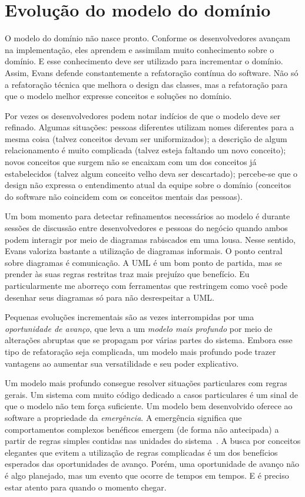 \documentclass[a4paper, 12pt]{article}
\begin{document}
\section{Evolução do modelo do domínio}

O modelo do domínio não nasce pronto. Conforme os desenvolvedores avançam na implementação, eles aprendem e assimilam muito conhecimento sobre o domínio. E esse conhecimento deve ser utilizado para incrementar o domínio. Assim, Evans defende constantemente a refatoração contínua do software. Não só a refatoração técnica que melhora o design das classes, mas a refatoração para que o modelo melhor expresse conceitos e soluções no domínio.

Por vezes os desenvolvedores podem notar indícios de que o modelo deve ser refinado. Algumas situações: pessoas diferentes utilizam nomes diferentes para a mesma coisa (talvez conceitos devam ser uniformizados); a descrição de algum relacionamento é muito complicada (talvez esteja faltando um novo conceito); novos conceitos que surgem não se encaixam com um dos conceitos já estabelecidos (talvez algum conceito velho deva ser descartado); percebe-se que o design não expressa o entendimento atual da equipe sobre o domínio (conceitos do software não coincidem com os conceitos mentais das pessoas).

Um bom momento para detectar refinamentos necessários ao modelo é durante sessões de discussão entre desenvolvedores e pessoas do negócio quando ambos podem interagir por meio de diagramas rabiscados em uma lousa. Nesse sentido, Evans valoriza bastante a utilização de diagramas informais. O ponto central sobre diagramas é comunicação. A UML é um bom ponto de partida, mas se prender às suas regras restritas traz mais prejuízo que benefício. Eu particularmente me aborreço com ferramentas que restringem como você pode desenhar seus diagramas só para não desrespeitar a UML.

Pequenas evoluções incrementais são as vezes interrompidas por uma \emph{oportunidade de avanço}, que leva a um \emph{modelo mais profundo} por meio de alterações abruptas que se propagam por várias partes do sistema. Embora esse tipo de refatoração seja complicada, um modelo mais profundo pode trazer vantagens ao aumentar sua versatilidade e seu poder explicativo. 

Um modelo mais profundo consegue resolver situações particulares com regras gerais. Um sistema com muito código dedicado a casos particulares é um sinal de que o modelo não tem força suficiente. Um modelo bem desenvolvido oferece ao software a propriedade da \emph{emergência}. A emergência significa que comportamentos complexos benéficos emergem (de forma não antecipada) a partir de regras simples contidas nas unidades do sistema~\cite{37signals2006GettingReal}. A busca por conceitos elegantes que evitem a utilização de regras complicadas é um dos benefícios esperados das oportunidades de avanço. Porém, uma oportunidade de avanço não é algo planejado, mas um evento que ocorre de tempos em tempos. E é preciso estar atento para quando o momento chegar.
\end{document}
